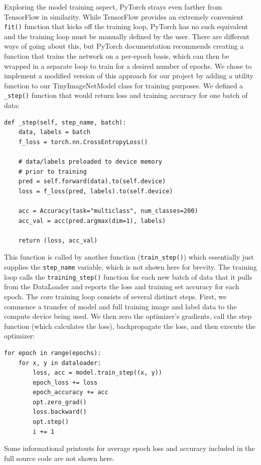 \documentclass[letterpaper,twocolumn,10pt]{article}
\begin{document}
Exploring the model training aspect, PyTorch strays even farther from TensorFlow in similarity. While TensorFlow provides an extremely convenient \verb|fit()| function that kicks off the training loop, PyTorch has no such equivalent and the training loop must be manually defined by the user. There are different ways of going about this, but PyTorch documentation recommends creating a function that trains the network on a per-epoch basis, which can then be wrapped in a separate loop to train for a desired number of epochs. We chose to implement a modified version of this approach for our project by adding a utility function to our TinyImageNetModel class for training purposes. We defined a \verb|_step()| function that would return loss and training accuracy for one batch of data:
\begin{verbatim}
def _step(self, step_name, batch):
    data, labels = batch
    f_loss = torch.nn.CrossEntropyLoss()

    # data/labels preloaded to device memory 
    # prior to training
    pred = self.forward(data).to(self.device)
    loss = f_loss(pred, labels).to(self.device)

    acc = Accuracy(task="multiclass", num_classes=200)
    acc_val = acc(pred.argmax(dim=1), labels)

    return (loss, acc_val)
\end{verbatim}
This function is called by another function (\verb|train_step()|) which essentially just supplies the \verb|step_name| variable, which is not shown here for brevity. The training loop calls the \verb|training_step()| function for each new batch of data that it pulls from the DataLoader and reports the loss and training set accuracy for each epoch. The core training loop consists of several distinct steps. First, we commence a transfer of model and full training image and label data to the compute device being used. We then zero the optimizer's gradients, call the step function (which calculates the loss), backpropagate the loss, and then execute the optimizer:
\begin{verbatim}
for epoch in range(epochs):
    for x, y in dataloader:
        loss, acc = model.train_step((x, y))
        epoch_loss += loss
        epoch_accuracy += acc
        opt.zero_grad()
        loss.backward()
        opt.step()
        i += 1
\end{verbatim}
Some informational printouts for average epoch loss and accuracy included in the full source code are not shown here.
\end{document}
